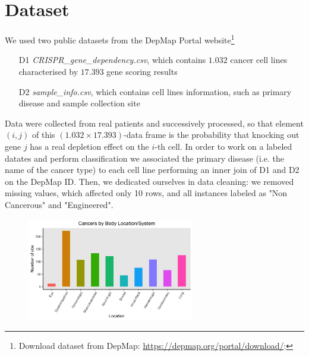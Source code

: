 \documentclass[a4paper,11pt, oneside]{article}  %
\begin{document}
\section{Dataset}
We used two public datasets from the DepMap Portal website\footnote{Download dataset from DepMap:  \url{https://depmap.org/portal/download/}:}
\begin{itemize}
	\item[D1] \textit{CRISPR\_gene\_dependency.csv},  which contains $1.032$ cancer cell lines characterised by $17.393$ gene scoring results
	\item[D2] \textit{sample\_info.csv}, which contains cell lines information,  such as primary disease and sample collection site
\end{itemize}
Data were collected from real patients and successively processed,  so that element $(i, j)$ of this $(1.032 \times 17.393)$-data frame is the probability that knocking out gene $j$ has a real depletion effect on the $i$-th cell.  In order to work on a labeled datates and perform classification we associated the primary disease (i.e.  the name of the cancer type) to each cell line performing an inner join of D1 and D2 on the DepMap ID.  Then,  we dedicated ourselves in data cleaning: we removed missing values,  which affected only 10 rows,  and all instances labeled as "Non Cancerous" and "Engineered".  


\begin{figure}
	\includegraphics[width=0.65\textwidth]{plot1.png}
	\label{fig1}
\end{figure}
\end{document}
